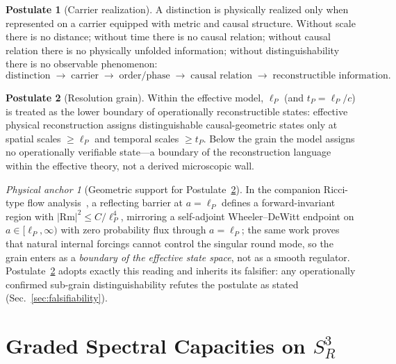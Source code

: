 \documentclass[11pt,a4paper]{article}
\theoremstyle{definition}
\newtheorem{postulate}{Postulate}
\theoremstyle{remark}
\newtheorem{anchor}[theorem]{Physical anchor}
\newcommand{\Sthree}{S^{3}}
\newcommand{\lP}{\ell_{P}}
\newcommand{\tP}{t_{P}}
\newcommand{\Rm}{\mathrm{Rm}}
\begin{document}
\begin{postulate}[Carrier realization]
\label{post:carrier}
A distinction is physically realized only when represented on a carrier equipped with metric
and causal structure.  Without scale there is no distance; without time there is no causal
relation; without causal relation there is no physically unfolded information; without
distinguishability there is no observable phenomenon:
\begin{equation}
\text{distinction}\;\to\;\text{carrier}\;\to\;\text{order/phase}\;\to\;\text{causal relation}
\;\to\;\text{reconstructible information}.
\label{eq:chain}
\end{equation}
\end{postulate}

\begin{postulate}[Resolution grain]
\label{post:grain}
Within the effective model, $\lP$ (and $\tP=\lP/c$) is treated as the lower boundary of
operationally reconstructible states: effective physical reconstruction assigns distinguishable
causal-geometric states only at spatial scales $\ge\lP$ and temporal scales $\ge\tP$.  Below
the grain the model assigns no operationally verifiable state---a boundary of the
reconstruction language within the effective theory, not a derived microscopic wall.
\end{postulate}

\begin{anchor}[Geometric support for Postulate~\ref{post:grain}]
In the companion Ricci-type flow analysis~\cite{BP2026ricci}, a reflecting barrier at $a=\lP$
defines a forward-invariant region with $|\Rm|^{2}\le C/\lP^{4}$, mirroring a self-adjoint
Wheeler--DeWitt endpoint on $a\in[\lP,\infty)$ with zero probability flux through $a=\lP$; the
same work proves that natural internal forcings cannot control the singular round mode, so the
grain enters as a \emph{boundary of the effective state space}, not as a smooth regulator.
Postulate~\ref{post:grain} adopts exactly this reading and inherits its falsifier: any
operationally confirmed sub-grain distinguishability refutes the postulate as stated
(Sec.~\ref{sec:falsifiability}).
\end{anchor}

\section{Graded Spectral Capacities on \texorpdfstring{$\Sthree_{R}$}{S3}}
\label{sec:capacity}
\end{document}
